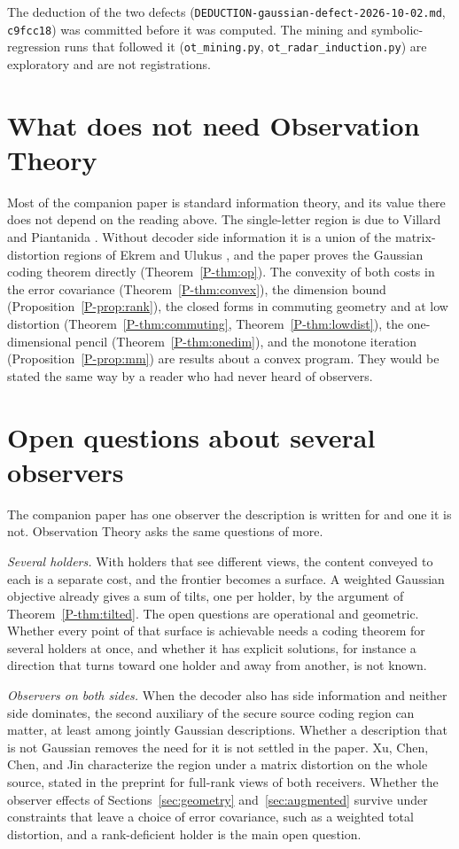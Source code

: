 \documentclass[11pt]{article}
\newcommand{\Th}[1]{Theorem~\ref{P-#1}}
\newcommand{\Pp}[1]{Proposition~\ref{P-#1}}
\begin{document}
The deduction of the two defects (\texttt{DEDUCTION-gaussian-defect-2026-10-02.md},
\texttt{c9fcc18}) was committed before it was computed. The mining and
symbolic-regression runs that followed it (\texttt{ot\_mining.py},
\texttt{ot\_radar\_induction.py}) are exploratory and are not
registrations.

\section{What does not need Observation Theory}
\label{sec:standard}

Most of the companion paper is standard information theory, and its
value there does not depend on the reading above. The single-letter
region is due to Villard and Piantanida \cite{villard2013}. Without
decoder side information it is a union of the matrix-distortion regions
of Ekrem and Ulukus \cite{ekrem2013}, and the paper proves the Gaussian
coding theorem directly (\Th{thm:op}). The convexity of both costs in
the error covariance (\Th{thm:convex}), the dimension bound
(\Pp{prop:rank}), the closed forms in commuting geometry and at low
distortion (\Th{thm:commuting}, \Th{thm:lowdist}), the one-dimensional
pencil (\Th{thm:onedim}), and the monotone iteration (\Pp{prop:mm}) are results about
a convex program. They would be stated the same way by a reader who had
never heard of observers.

\section{Open questions about several observers}
\label{sec:open}

The companion paper has one observer the description is written for and
one it is not. Observation Theory asks the same questions of more.

\emph{Several holders.} With holders that see different views, the
content conveyed to each is a separate cost, and the frontier becomes a
surface. A weighted Gaussian objective already gives a sum of tilts, one
per holder, by the argument of \Th{thm:tilted}. The open questions are
operational and geometric. Whether every point of that surface is
achievable needs a coding theorem for several holders at once, and
whether it has explicit solutions, for instance a direction that turns
toward one holder and away from another, is not known.

\emph{Observers on both sides.} When the decoder also has side
information and neither side dominates, the second auxiliary of the
secure source coding region can matter, at least among jointly Gaussian
descriptions. Whether a description that is not Gaussian removes the
need for it is not settled in the paper. Xu, Chen, Chen, and Jin
\cite{xu2024} characterize the region under a matrix distortion on the
whole source, stated in the preprint for full-rank views of both
receivers. Whether the observer effects of
Sections~\ref{sec:geometry} and~\ref{sec:augmented} survive under
constraints that leave a choice of error covariance, such as a weighted
total distortion, and a rank-deficient holder is the main open question.
\end{document}
